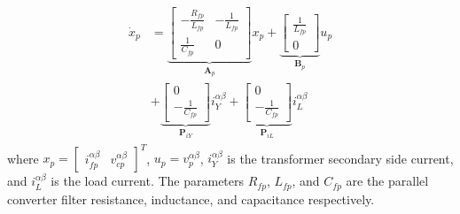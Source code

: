 \begin{align}
    \begin{aligned}
        \dot{x}_p &=
        \underbrace{
        \begin{bmatrix}
            -\frac{R_{fp}}{L_{fp}} & -\frac{1}{L_{fp}}\\
            \frac{1}{C_{fp}} & 0
        \end{bmatrix}
        }_{\mathbf{A}_p}
        x_p +
        \underbrace{
        \begin{bmatrix}
            \frac{1}{L_{fp}}\\
            0
        \end{bmatrix}
        }_{\mathbf{B}_p}
        u_p\\
        &+
        \underbrace{
        \begin{bmatrix}
            0\\
            -\frac{1}{C_{fp}}
        \end{bmatrix}
        }_{\mathbf{P}_{iY}}
        i_Y^{\alpha\beta}
        +
        \underbrace{
        \begin{bmatrix}
            0\\
            -\frac{1}{C_{fp}}
        \end{bmatrix}
        }_{\mathbf{P}_{iL}}
        i_L^{\alpha\beta} \label{eq:ParallelConverter_Dynamics}
    \end{aligned}
\end{align}
where $x_p = \begin{bmatrix} i_{fp}^{\alpha\beta} & v_{cp}^{\alpha\beta} \end{bmatrix}^T$, $u_p = v_p^{\alpha\beta}$, $i_Y^{\alpha\beta}$ is the transformer secondary side current, and $i_L^{\alpha\beta}$ is the load current. The parameters $R_{fp}$, $L_{fp}$, and $C_{fp}$ are the parallel converter filter resistance, inductance, and capacitance respectively.

